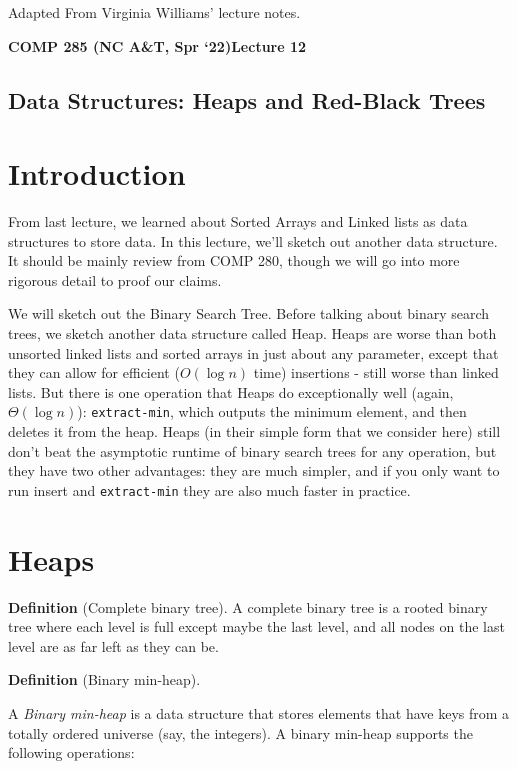 \documentclass [12pt]{article}
\begin{document}
 

\vspace {1em} 
\begin {Instruction} 
Adapted From Virginia Williams' lecture notes.
\end {Instruction}  

{\LARGE \textbf {COMP 285 (NC A\&T, Spr `22)}\hfill \textbf {Lecture 12} } 

\begin{centering}
\section*{Data Structures: Heaps and Red-Black Trees}
\end{centering}

\section{Introduction}
From last lecture, we learned about Sorted Arrays and Linked lists as data structures to store data. In this lecture, we'll sketch out another data structure. It should be mainly review from COMP 280, though we will go into more rigorous detail to proof our claims.

We will sketch out the Binary Search Tree. Before talking about binary search trees, we sketch another data structure called Heap. Heaps are worse than both unsorted linked lists and sorted arrays in just about any parameter, except that they can allow for efficient ($O(\log n)$ time) insertions - still worse than linked lists. But there is one operation that Heaps do exceptionally well (again, $\Theta(\log n)$): \texttt{extract-min}, which outputs the minimum element, and then deletes it from the heap. Heaps (in their simple form that we consider here) still don't beat the asymptotic runtime of binary search trees for any operation, but they have two other advantages: they are much simpler, and if you only want to run insert and \texttt{extract-min} they are also much faster in practice.

\section{Heaps} \textbf{Definition} (Complete binary tree). A complete binary tree is a rooted binary tree where each level is full except maybe the last level, and all nodes on the last level are as far left as they can be.

\textbf{Definition} (Binary min-heap). 

A \textit{Binary min-heap} is a data structure that stores elements that have keys from a totally ordered universe (say, the integers). A binary min-heap supports the following operations: 
\end{document}
